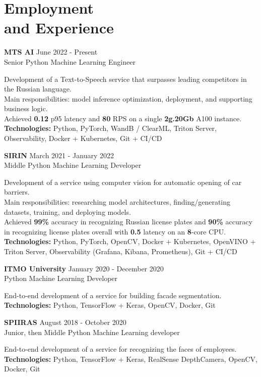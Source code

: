 \section{\sc Employment \\and Experience}
\vspace{2.6pt}

\textbf{MTS AI} \hfill June 2022 - Present \\
Senior Python Machine Learning Engineer

Development of a Text-to-Speech service that surpasses leading competitors in the Russian language. \\
Main responsibilities: model inference optimization, deployment, and supporting business logic. \\
Achieved \textbf{0.12} p95 latency and \textbf{80} RPS on a single \textbf{2g.20Gb} A100 instance. \\
\textbf{Technologies:} Python, PyTorch, WandB / ClearML, Triton Server, Observability, Docker + Kubernetes, Git + CI/CD

\textbf{SIRIN} \hfill March 2021 - January 2022 \\
Middle Python Machine Learning Developer

Development of a service using computer vision for automatic opening of car barriers. \\
Main responsibilities: researching model architectures, finding/generating datasets, training, and deploying models. \\
Achieved \textbf{99\%} accuracy in recognizing Russian license plates and \textbf{90\%} accuracy in recognizing license plates overall with \textbf{0.5} latency on an \textbf{8}-core CPU. \\
\textbf{Technologies:} Python, PyTorch, OpenCV, Docker + Kubernetes, OpenVINO + Triton Server, Observability (Grafana, Kibana, Prometheus), Git + CI/CD

\textbf{ITMO University} \hfill January 2020 - December 2020 \\
Python Machine Learning Developer

End-to-end development of a service for building facade segmentation. \\
\textbf{Technologies:} Python, TensorFlow + Keras, OpenCV, Docker, Git

\textbf{SPIIRAS} \hfill August 2018 - October 2020 \\
Junior, then Middle Python Machine Learning developer

End-to-end development of a service for recognizing the faces of employees. \\
\textbf{Technologies:} Python, TensorFlow + Keras, RealSense DepthCamera, OpenCV, Docker, Git

\endinput
